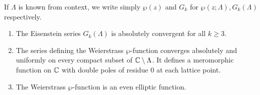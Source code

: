 \begin{notation}
	If $\Lambda$ is known from context, we write simply
	$\wp(z)$ and $G_k$ for $\wp(z; \Lambda), G_k(\Lambda)$
	respectively.
\end{notation}

\begin{proposition}
	\label{prop:wp-properties}
	\begin{enumerate}[label=(\alph*)]
		\item	The Eisenstein series $G_k(\Lambda)$ is absolutely convergent
			for all $k \geq 3$.
		\item The series defining the Weierstrass $\wp$-function converges
			absolutely and uniformly on every compact subset of
			$\mathbb{C}\setminus\Lambda$. It defines a meromorphic function on $\mathbb{C}$ with 
			double poles of residue 0 at each lattice point.
		\item The Weierstrass $\wp$-function is an even elliptic function.
	\end{enumerate}
\end{proposition}


